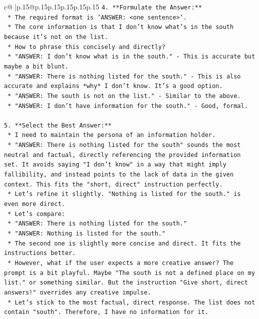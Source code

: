 \documentclass{article}
\begin{document}
{\begin{supertabular}{c@{$\;$}|p{.15\linewidth}@{}p{.15\linewidth}p{.15\linewidth}p{.15\linewidth}p{.15\linewidth}p{.15\linewidth}}
{{{\texttt{4.  **Formulate the Answer:**} \\
\texttt{    *   The required format is `ANSWER: <one sentence>`.} \\
\texttt{    *   The core information is that I don't know what's in the south because it's not on the list.} \\
\texttt{    *   How to phrase this concisely and directly?} \\
\texttt{        *   "ANSWER: I don't know what is in the south." {-} This is accurate but maybe a bit blunt.} \\
\texttt{        *   "ANSWER: There is nothing listed for the south." {-} This is also accurate and explains *why* I don't know. It's a good option.} \\
\texttt{        *   "ANSWER: The south is not on the list." {-} Similar to the above.} \\
\texttt{        *   "ANSWER: I don't have information for the south." {-} Good, formal.} \\
\\ 
\texttt{5.  **Select the Best Answer:**} \\
\texttt{    *   I need to maintain the persona of an information holder.} \\
\texttt{    *   "ANSWER: There is nothing listed for the south" sounds the most neutral and factual, directly referencing the provided information set. It avoids saying "I don't know" in a way that might imply fallibility, and instead points to the lack of data in the given context. This fits the "short, direct" instruction perfectly.} \\
\texttt{    *   Let's refine it slightly. "Nothing is listed for the south." is even more direct.} \\
\texttt{    *   Let's compare:} \\
\texttt{        *   "ANSWER: There is nothing listed for the south."} \\
\texttt{        *   "ANSWER: Nothing is listed for the south."} \\
\texttt{    *   The second one is slightly more concise and direct. It fits the instructions better.} \\
\texttt{    *   However, what if the user expects a more creative answer? The prompt is a bit playful. Maybe "The south is not a defined place on my list." or something similar. But the instruction "Give short, direct answers!" overrides any creative impulse.} \\
\texttt{    *   Let's stick to the most factual, direct response. The list does not contain "south". Therefore, I have no information for it.} \\
}}}
\end{supertabular}}
\end{document}
